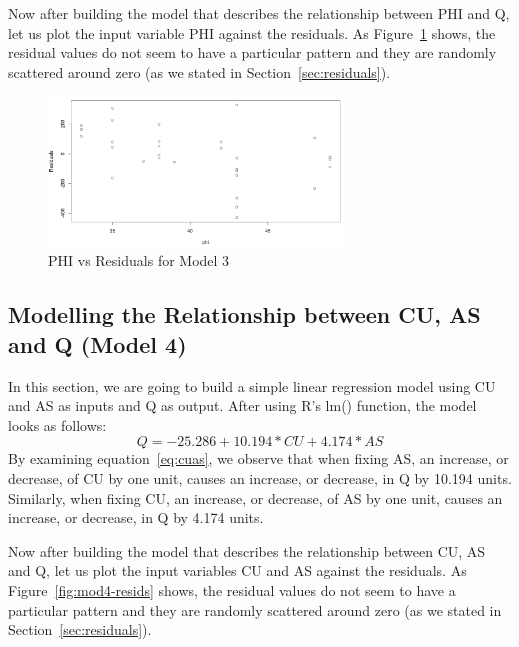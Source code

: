 \documentclass[a4paper,12pt, english]{article}
\begin{document}
Now after building the model that describes the relationship between PHI and Q, let us plot the input variable PHI against the residuals. As Figure~\ref{fig:mod3-resid1} shows, the residual values do not seem to have a particular pattern and they are randomly scattered around zero (as we stated in Section~\ref{sec:residuals}).

\begin{figure}[H]
  \centering
  \includegraphics[width=0.6986\textwidth]{mod3-resid1}
  \caption{PHI vs Residuals for Model 3}
  \label{fig:mod3-resid1}
\end{figure}


\subsection{Modelling the Relationship between CU, AS and Q (Model 4)} \label{sec:cuasmodel}
In this section, we are going to build a simple linear regression model using CU and AS as inputs and Q as output. After using R's lm() function, the model looks as follows:\\
\begin{equation}
\label{eq:cuas}
Q = -25.286   +    10.194*CU +       4.174*AS
\end{equation}       
By examining equation~\ref{eq:cuas}, we observe that when fixing AS, an increase, or decrease, of CU by one unit, causes an increase, or decrease, in Q by 10.194 units.
Similarly, when fixing CU, an increase, or decrease, of AS by one unit, causes an increase, or decrease, in Q by 4.174 units.

Now after building the model that describes the relationship between CU, AS and Q, let us plot the input variables CU and AS against the residuals. As Figure~\ref{fig:mod4-resids} shows, the residual values do not seem to have a particular pattern and they are randomly scattered around zero (as we stated in Section~\ref{sec:residuals}).
\end{document}
